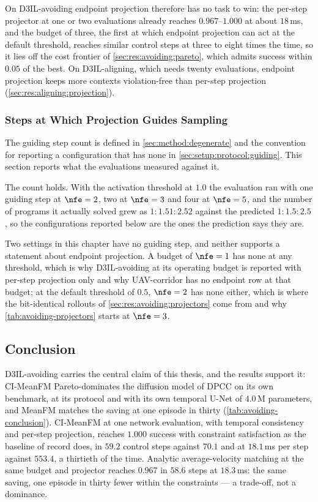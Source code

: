 On D3IL-avoiding endpoint projection therefore has no task to win: the per-step projector at one or two
evaluations already reaches $0.967$--$1.000$ at about $18$\,ms, and the budget of three, the first at which
endpoint projection can act at the default threshold, reaches similar control steps at three to eight times
the time, so it lies off the cost frontier of \autoref{sec:res:avoiding:pareto}, which admits success within
$0.05$ of the best. On D3IL-aligning, which needs twenty
evaluations, endpoint projection keeps more contexts violation-free than per-step projection
(\autoref{sec:res:aligning:projection}).

\subsubsection{Steps at Which Projection Guides Sampling}\label{sec:res:constraints:degenerate}

The guiding step count is defined in \autoref{sec:method:degenerate} and the convention for reporting a
configuration that has none in \autoref{sec:setup:protocol:guiding}. This section reports what the
evaluations measured against it.

The count holds. With the activation threshold at $1.0$ the evaluation ran with one guiding step at
$\nfe=2$, two at $\nfe=3$ and four at $\nfe=5$, and the number of programs it actually solved grew as
$1:1.51:2.52$ against the predicted $1:1.5:2.5$, so the configurations reported below are the ones the
prediction says they are.

Two settings in this chapter have no guiding step, and neither supports a statement about endpoint
projection. A budget of $\nfe=1$ has none at any threshold, which is why D3IL-avoiding at its operating
budget is reported with per-step projection only and why UAV-corridor has no endpoint row at that budget;
at the default threshold of $0.5$, $\nfe=2$ has none either, which is where the bit-identical rollouts
of \autoref{sec:res:avoiding:projectors} come from and why \autoref{tab:avoiding-projectors} starts at
$\nfe=3$.

\subsection{Conclusion}\label{sec:res:avoiding:conclusion}

D3IL-avoiding carries the central claim of this thesis, and the results support it: CI-MeanFM
Pareto-dominates the diffusion model of \ac{DPCC} on its own benchmark, at its protocol and with its own
temporal U-Net of $4.0$\,M parameters, and MeanFM matches the saving at one episode in thirty
(\autoref{tab:avoiding-conclusion}). CI-MeanFM at one network evaluation, with temporal consistency and
per-step projection, reaches $1.000$ success with constraint satisfaction as the baseline of record does, in
$59.2$ control steps against $70.1$ and at $18.1$\,ms per step against $553.4$, a thirtieth of the time.
Analytic average-velocity matching at the same budget and projector reaches $0.967$ in $58.6$ steps at
$18.3$\,ms: the same saving, one episode in thirty fewer within the constraints --- a trade-off, not a
dominance.

